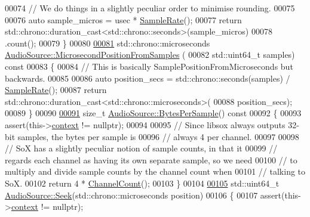 \begin{DoxyCode}
00074     \textcolor{comment}{// We do things in a slightly peculiar order to minimise rounding.}
00075 
00076     \textcolor{keyword}{auto} sample\_micros = usec * \hyperlink{classAudioSource_aee0c4889919554f3c947a217f4436378}{SampleRate}();
00077     \textcolor{keywordflow}{return} std::chrono::duration\_cast<std::chrono::seconds>(sample\_micros)
00078                     .count();
00079 \}
00080 
\hypertarget{audio__source_8cpp_source_l00081}{}\hyperlink{classAudioSource_aa9c0d4b60adfc1470a560bbb8e66aaf8}{00081} std::chrono::microseconds \hyperlink{classAudioSource_aa9c0d4b60adfc1470a560bbb8e66aaf8}{AudioSource::MicrosecondPositionFromSamples}
      (
00082                 std::uint64\_t samples)\textcolor{keyword}{ const}
00083 \textcolor{keyword}{}\{
00084     \textcolor{comment}{// This is basically SamplePositionFromMicroseconds but backwards.}
00085 
00086     \textcolor{keyword}{auto} position\_secs = std::chrono::seconds(samples) / \hyperlink{classAudioSource_aee0c4889919554f3c947a217f4436378}{SampleRate}();
00087     \textcolor{keywordflow}{return} std::chrono::duration\_cast<std::chrono::microseconds>(
00088                     position\_secs);
00089 \}
00090 
\hypertarget{audio__source_8cpp_source_l00091}{}\hyperlink{classAudioSource_ae6eb4d0fc3d1d60375edc2745b635818}{00091} \textcolor{keywordtype}{size\_t} \hyperlink{classAudioSource_ae6eb4d0fc3d1d60375edc2745b635818}{AudioSource::BytesPerSample}()\textcolor{keyword}{ const}
00092 \textcolor{keyword}{}\{
00093     assert(this->\hyperlink{classAudioSource_a2bbce89d4bef9cf46b1113de3245655a}{context} != \textcolor{keyword}{nullptr});
00094 
00095     \textcolor{comment}{// Since libsox always outputs 32-bit samples, the bytes per sample is}
00096     \textcolor{comment}{// always 4 per channel.}
00097 
00098     \textcolor{comment}{// SoX has a slightly peculiar notion of sample counts, in that it}
00099     \textcolor{comment}{// regards each channel as having its own separate sample, so we need}
00100     \textcolor{comment}{// to multiply and divide sample counts by the channel count when}
00101     \textcolor{comment}{// talking to SoX.}
00102     \textcolor{keywordflow}{return} 4 * \hyperlink{classAudioSource_a267178b39a3a4d2fc86f41f6a96caf03}{ChannelCount}();
00103 \}
00104 
\hypertarget{audio__source_8cpp_source_l00105}{}\hyperlink{classAudioSource_ad8639603fb59d21f5c1369707f16975c}{00105} std::uint64\_t \hyperlink{classAudioSource_ad8639603fb59d21f5c1369707f16975c}{AudioSource::Seek}(std::chrono::microseconds position)
00106 \{
00107     assert(this->\hyperlink{classAudioSource_a2bbce89d4bef9cf46b1113de3245655a}{context} != \textcolor{keyword}{nullptr});

\end{DoxyCode}
